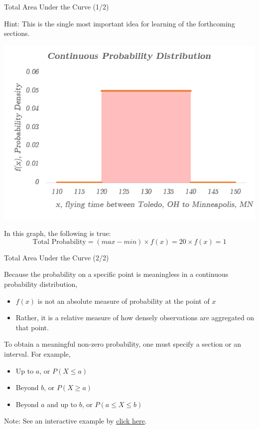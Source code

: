 \documentclass{beamer}
\begin{document}
\begin{frame}{Total Area Under the Curve (1/2)}

Hint: This is the single most important idea for learning of the forthcoming sections. 
\begin{center}
\includegraphics[scale=0.3]{images/section4ContinuousUniformAreaUnderCurve.png}
\end{center}
In this graph, the following is true: 
$$ \text{Total Probability} = (max - min)\times f(x) = 20 \times f(x) = 1 $$

\end{frame}


\begin{frame}{Total Area Under the Curve (2/2)}

Because the probability on a specific point is meaningless in a continuous probability distribution, 
\begin{itemize}
\item $f(x)$ is not an absolute measure of probability at the point of $x$
\item Rather, it is a relative measure of how densely observations are aggregated on that point. 
\end{itemize}

To obtain a meaningful non-zero probability, one must specify a section or an interval. For example,
\begin{itemize}
\item Up to $a$, or $P(X\leq a)$
\item Beyond $b$, or $P(X\geq a)$
\item Beyond $a$ and up to $b$, or $P(a\leq X \leq b)$
\end{itemize}

\vspace{0.5 cm}
Note: See an interactive example by \href{http://wentoday.com/wp/2020/10/06/the-area-under-the-curve-concept-using-uniform-distribution/}{click here}.

\end{frame}
\end{document}
